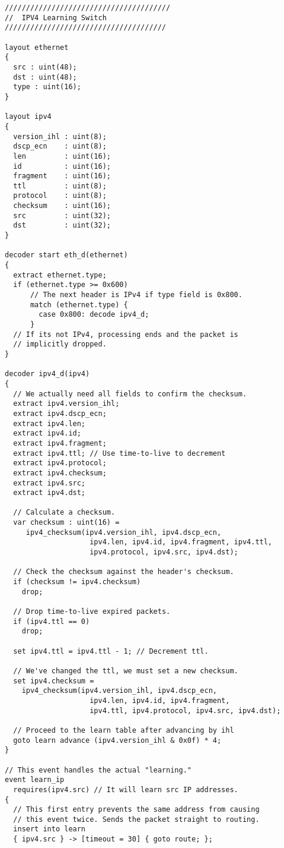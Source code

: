 \begin{lstlisting}
///////////////////////////////////////
//  IPV4 Learning Switch
//////////////////////////////////////

layout ethernet
{
  src : uint(48);
  dst : uint(48);
  type : uint(16);
}

layout ipv4
{
  version_ihl : uint(8);
  dscp_ecn    : uint(8);
  len         : uint(16);
  id          : uint(16);
  fragment    : uint(16);
  ttl         : uint(8);
  protocol    : uint(8);
  checksum    : uint(16);
  src         : uint(32);
  dst         : uint(32);
}

decoder start eth_d(ethernet)
{
  extract ethernet.type;
  if (ethernet.type >= 0x600)
      // The next header is IPv4 if type field is 0x800.
      match (ethernet.type) {
        case 0x800: decode ipv4_d;
      }
  // If its not IPv4, processing ends and the packet is
  // implicitly dropped.
}

decoder ipv4_d(ipv4)
{
  // We actually need all fields to confirm the checksum.
  extract ipv4.version_ihl;
  extract ipv4.dscp_ecn;
  extract ipv4.len;
  extract ipv4.id;
  extract ipv4.fragment;
  extract ipv4.ttl; // Use time-to-live to decrement
  extract ipv4.protocol;
  extract ipv4.checksum;
  extract ipv4.src;
  extract ipv4.dst;

  // Calculate a checksum.
  var checksum : uint(16) =
     ipv4_checksum(ipv4.version_ihl, ipv4.dscp_ecn, 
     				ipv4.len, ipv4.id, ipv4.fragment, ipv4.ttl, 
     				ipv4.protocol, ipv4.src, ipv4.dst);

  // Check the checksum against the header's checksum.
  if (checksum != ipv4.checksum)
    drop;

  // Drop time-to-live expired packets.
  if (ipv4.ttl == 0)
    drop;

  set ipv4.ttl = ipv4.ttl - 1; // Decrement ttl.

  // We've changed the ttl, we must set a new checksum.
  set ipv4.checksum =
    ipv4_checksum(ipv4.version_ihl, ipv4.dscp_ecn, 
    				ipv4.len, ipv4.id, ipv4.fragment, 
    				ipv4.ttl, ipv4.protocol, ipv4.src, ipv4.dst);

  // Proceed to the learn table after advancing by ihl
  goto learn advance (ipv4.version_ihl & 0x0f) * 4;
}

// This event handles the actual "learning."
event learn_ip
  requires(ipv4.src) // It will learn src IP addresses.
{
  // This first entry prevents the same address from causing
  // this event twice. Sends the packet straight to routing.
  insert into learn
  { ipv4.src } -> [timeout = 30] { goto route; };


\end{lstlisting}
